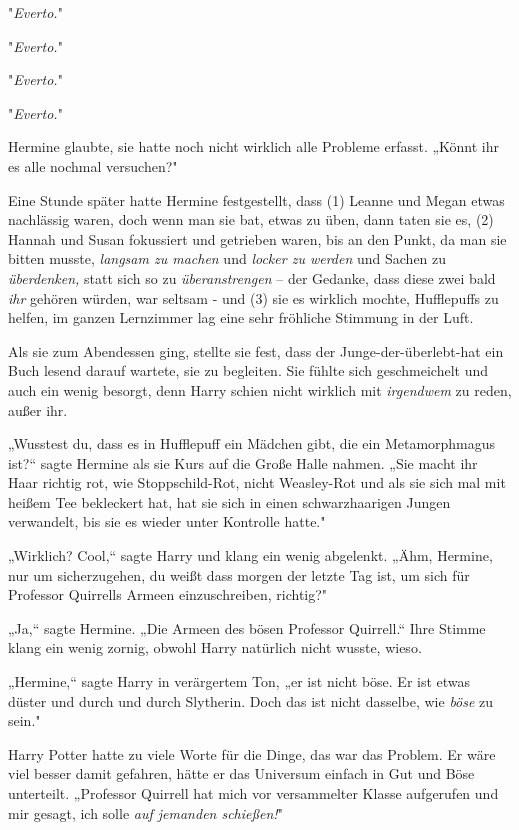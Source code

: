 {"\emph{Everto.}"

"\emph{Everto.}"

"\emph{Everto.}"

"\emph{Everto.}"

Hermine glaubte, sie hatte noch nicht wirklich alle Probleme erfasst. „Könnt ihr es alle nochmal versuchen?"

Eine Stunde später hatte Hermine festgestellt, dass (1) Leanne und Megan etwas nachlässig waren, doch wenn man sie bat, etwas zu üben, dann taten sie es, (2) Hannah und Susan fokussiert und getrieben waren, bis an den Punkt, da man sie bitten musste, \emph{langsam zu machen} und \emph{locker zu werden} und Sachen zu \emph{überdenken,} statt sich so zu \emph{überanstrengen} -- der Gedanke, dass diese zwei bald \emph{ihr} gehören würden, war seltsam - und (3) sie es wirklich mochte, Hufflepuffs zu helfen, im ganzen Lernzimmer lag eine sehr fröhliche Stimmung in der Luft.

Als sie zum Abendessen ging, stellte sie fest, dass der Junge-der-überlebt-hat ein Buch lesend darauf wartete, sie zu begleiten. Sie fühlte sich geschmeichelt und auch ein wenig besorgt, denn Harry schien nicht wirklich mit \emph{irgendwem} zu reden, außer ihr.

„Wusstest du, dass es in Hufflepuff ein Mädchen gibt, die ein Metamorphmagus ist?“ sagte Hermine als sie Kurs auf die Große Halle nahmen. „Sie macht ihr Haar richtig rot, wie Stoppschild-Rot, nicht Weasley-Rot und als sie sich mal mit heißem Tee bekleckert hat, hat sie sich in einen schwarzhaarigen Jungen verwandelt, bis sie es wieder unter Kontrolle hatte."

„Wirklich? Cool,“ sagte Harry und klang ein wenig abgelenkt. „Ähm, Hermine, nur um sicherzugehen, du weißt dass morgen der letzte Tag ist, um sich für Professor Quirrells Armeen einzuschreiben, richtig?"

„Ja,“ sagte Hermine. „Die Armeen des bösen Professor Quirrell.“ Ihre Stimme klang ein wenig zornig, obwohl Harry natürlich nicht wusste, wieso.

„Hermine,“ sagte Harry in verärgertem Ton, „er ist nicht böse. Er ist etwas düster und durch und durch Slytherin. Doch das ist nicht dasselbe, wie \emph{böse} zu sein."

Harry Potter hatte zu viele Worte für die Dinge, das war das Problem. Er wäre viel besser damit gefahren, hätte er das Universum einfach in Gut und Böse unterteilt. „Professor Quirrell hat mich vor versammelter Klasse aufgerufen und mir gesagt, ich solle \emph{auf jemanden schießen!}"

}
